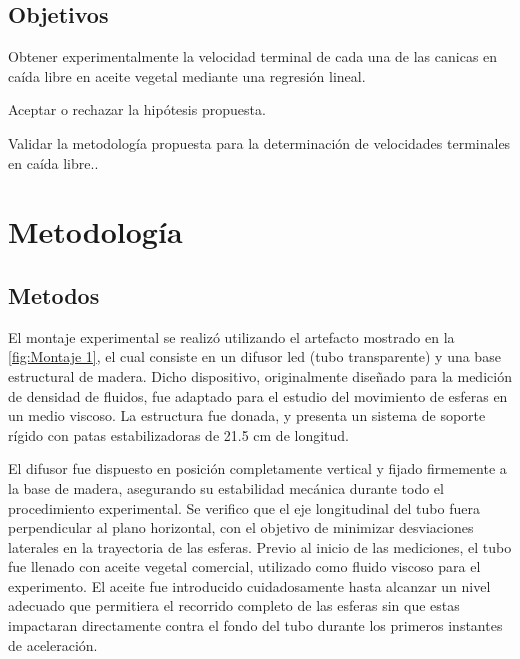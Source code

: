 \documentclass[12pt,a4paper]{config/myConfig}
\begin{document}
\subsection{Objetivos}
\label{sec:OBJECTIVOS}

\begin{objectives}
  \item \label{obj:A} Obtener experimentalmente la velocidad terminal de cada una de las canicas en caída libre en aceite vegetal mediante una regresión lineal.
  \item \label{obj:B} Aceptar o rechazar la hipótesis propuesta.
  \item \label{obj:C} Validar la metodología propuesta para la determinación de velocidades terminales en caída libre..
\end{objectives}

\section{Metodología}
\label{sec:METODOLOGIA}



\subsection{Metodos}
\label{sec:METODOS}

\indent El montaje experimental se realizó utilizando el artefacto mostrado en la \cref{fig:Montaje 1}, el cual consiste en un difusor led (tubo transparente) y una base estructural de madera. Dicho dispositivo, originalmente diseñado para la medición de densidad de fluidos, fue adaptado para el estudio del movimiento de esferas en un medio viscoso. La estructura fue donada, y presenta un sistema de soporte rígido con patas estabilizadoras de 21.5 cm de longitud. 


\indent El difusor fue dispuesto en posición completamente vertical y fijado firmemente a la base de madera, asegurando su estabilidad mecánica durante todo el procedimiento experimental. Se verifico que el eje longitudinal del tubo fuera perpendicular al plano horizontal, con el objetivo de minimizar desviaciones laterales en la trayectoria de las esferas. Previo al inicio de las mediciones, el tubo fue llenado con aceite vegetal comercial, utilizado como fluido viscoso para el experimento. El aceite fue introducido cuidadosamente hasta alcanzar un nivel adecuado que permitiera el recorrido completo de las esferas sin que estas impactaran directamente contra el fondo del tubo durante los primeros instantes de aceleración. 
\end{document}
